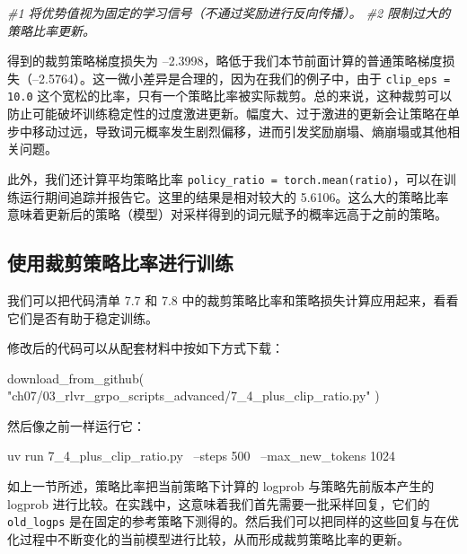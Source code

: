 {\noindent\small\textit{\#1 将优势值视为固定的学习信号（不通过奖励进行反向传播）。 \newline \#2 限制过大的策略比率更新。}\par}

得到的裁剪策略梯度损失为 –2.3998，略低于我们本节前面计算的普通策略梯度损失（–2.5764）。这一微小差异是合理的，因为在我们的例子中，由于 \texttt{clip\_eps = 10.0} 这个宽松的比率，只有一个策略比率被实际裁剪。总的来说，这种裁剪可以防止可能破坏训练稳定性的过度激进更新。幅度大、过于激进的更新会让策略在单步中移动过远，导致词元概率发生剧烈偏移，进而引发奖励崩塌、熵崩塌或其他相关问题。

此外，我们还计算平均策略比率 \texttt{policy\_ratio = torch.mean(ratio)}，可以在训练运行期间追踪并报告它。这里的结果是相对较大的 5.6106。这么大的策略比率意味着更新后的策略（模型）对采样得到的词元赋予的概率远高于之前的策略。

\subsection{使用裁剪策略比率进行训练}

我们可以把代码清单 7.7 和 7.8 中的裁剪策略比率和策略损失计算应用起来，看看它们是否有助于稳定训练。

修改后的代码可以从配套材料中按如下方式下载：

\begin{codebox}
download_from_github(
    "ch07/03_rlvr_grpo_scripts_advanced/7_4_plus_clip_ratio.py"
)
\end{codebox}

然后像之前一样运行它：

\begin{codebox}
uv run 7_4_plus_clip_ratio.py \
    --steps 500  \
    --max_new_tokens 1024
\end{codebox}

如上一节所述，策略比率把当前策略下计算的 logprob 与策略先前版本产生的 logprob 进行比较。在实践中，这意味着我们首先需要一批采样回复，它们的 \texttt{old\_logps} 是在固定的参考策略下测得的。然后我们可以把同样的这些回复与在优化过程中不断变化的当前模型进行比较，从而形成裁剪策略比率的更新。

